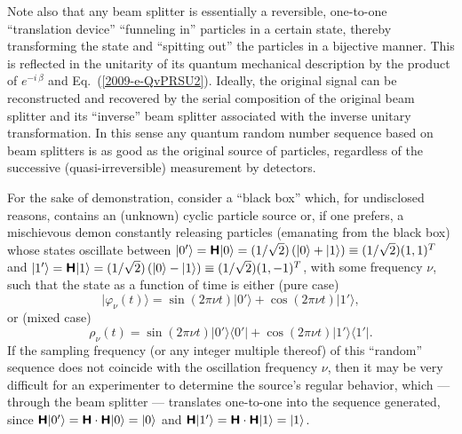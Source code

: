 \documentclass[10pt]{article}%
\begin{document}
Note also that any beam splitter is essentially a reversible, one-to-one
``translation device'' ``funneling in'' particles in a certain state, thereby transforming
the state and ``spitting out'' the particles in a bijective manner.
This is reflected in the unitarity of its quantum mechanical description
by the product of $e^{-i\,\beta}$ and  Eq.~(\ref{2009-e-QvPRSU2}).
Ideally, the original signal can be reconstructed and recovered by the serial composition
of the original beam splitter and its ``inverse'' beam splitter associated with the inverse unitary transformation.
In this sense
any quantum random number sequence based on beam splitters is as good as the original source of particles, regardless of the successive (quasi-irreversible) measurement by detectors.

For the sake of demonstration, consider a ``black box'' which,
for undisclosed reasons, contains an (unknown) cyclic particle source or,
if one prefers, a mischievous demon  constantly
releasing particles (emanating from the black box) whose states oscillate
between
$\vert 0' \rangle =
\textsf{\textbf{H}} \vert 0 \rangle =
({1}/{\sqrt{2}}) \left( \vert 0 \rangle
  + \vert 1  \rangle \right) \equiv ({1}/{\sqrt{2}}) (1,1)^T$
and
$\vert 1' \rangle =
\textsf{\textbf{H}} \vert 1 \rangle =
({1}/{\sqrt{2}}) \left( \vert 0 \rangle
  - \vert 1  \rangle \right) \equiv ({1}/{\sqrt{2}}) (1,-1)^T
$, with some frequency $\nu$, such that the state as a function of time is
either (pure case)
\begin{equation}
\vert \varphi_\nu (t) \rangle =  \sin (2\pi \nu t)
\vert 0' \rangle
+
 \cos (2\pi \nu t)
\vert 1' \rangle ,
\end{equation}
or (mixed case)
\begin{equation}
\rho_\nu (t)  =  \sin (2\pi \nu t)
\vert 0' \rangle \langle 0'  \vert
+
 \cos (2\pi \nu t)
\vert 1' \rangle \langle 1'  \vert
.
\end{equation}
If the sampling frequency (or any integer multiple thereof)
of this ``random'' sequence does not coincide with the oscillation frequency $\nu$,
then it may be very difficult for an experimenter to determine the source's regular behavior,
which --- through the beam splitter ---  translates one-to-one into the sequence generated,
since
$\textsf{\textbf{H}}
\vert 0' \rangle
= \textsf{\textbf{H}} \cdot \textsf{\textbf{H}}  \vert 0 \rangle =
 \vert 0 \rangle
$
and
$\textsf{\textbf{H}}
\vert 1' \rangle
=        \textsf{\textbf{H}} \cdot \textsf{\textbf{H}}  \vert 1 \rangle =
\vert 1 \rangle
$.
\end{document}
